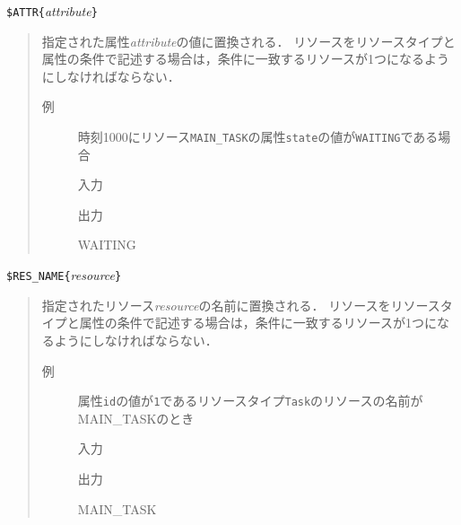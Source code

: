 {\nopagebreak
\noindent
\verb|$ATTR{|\textit{attribute}\verb|}|
\vspace{-0.75zw}
\begin{quote}
指定された属性{\it attribute}の値に置換される．
リソースをリソースタイプと属性の条件で記述する場合は，条件に一致するリソースが1つになるようにしなければならない．

\vspace{-1zw}
\begin{description}
\item[例] 時刻1000にリソース{\tt MAIN\_TASK}の属性{\tt state}の値が{\tt WAITING}である場合

\hspace*{-1zw}入力\vspace{-1.75zw}
\hspace*{-1zw}出力\vspace{-1.75zw}
\begin{EBNF}
WAITING
\end{EBNF}
\end{description}

\end{quote}
}
{\nopagebreak
\noindent
\verb|$RES_NAME{|\textit{resource}\verb|}|
\vspace{-0.5zw}
\begin{quote}
指定されたリソース{\it resource}の名前に置換される．
リソースをリソースタイプと属性の条件で記述する場合は，条件に一致するリソースが1つになるようにしなければならない．

\begin{description}
\item[例] 属性{\tt id}の値が{\tt 1}であるリソースタイプ{\tt Task}のリソースの名前がMAIN\_TASKのとき

\hspace*{-1zw}入力\vspace{-1.75zw}
\hspace*{-1zw}出力\vspace{-1.75zw}
\begin{EBNF}
MAIN_TASK
\end{EBNF}
\end{description}

\end{quote}
}
